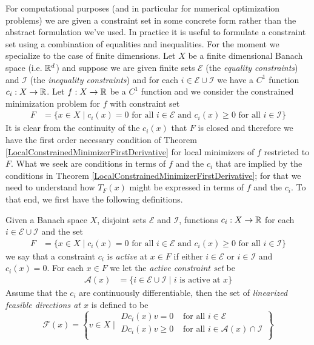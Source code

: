  For computational purposes (and in particular for numerical
optimization problems) we are given a constraint set in some concrete
form rather than the abstract formulation we've used.  In practice it
is useful to formulate a constraint set using a combination of
equalities and inequalities.  For the moment we specialize to the case
of finite dimensions.  Let $X$ be a finite dimensional Banach space
(i.e. $\mathbb{R}^d$) and suppose we are given finite sets $\mathcal{E}$
(the \emph{equality constraints})
and $\mathcal{I}$ (the \emph{inequality constraints}) and for each $i
\in \mathcal{E} \cup \mathcal{I}$ we have a $C^1$ 
function $c_i : X \to \mathbb{R}$.  Let $f : X \to \mathbb{R}$ be a $C^1$
function and we consider the constrained minimization problem for $f$
with constraint set 
\begin{align*}
F &= \lbrace x \in X \mid c_i(x) = 0 \text{ for all $i \in
    \mathcal{E}$ and } c_i(x) \geq 0 \text{ for all $i \in
    \mathcal{I}$} \rbrace
\end{align*}
It is clear from the continuity of the $c_i(x)$ that $F$ is closed and
therefore we have the first order necessary condition of Theorem
\ref{LocalConstrainedMinimizerFirstDerivative} for local minimizers of
$f$ restricted to $F$.  What we seek are
conditions in terms of $f$ and the $c_i$ that are implied by the
conditions in Theorem \ref{LocalConstrainedMinimizerFirstDerivative};
for that we need to understand how $T_F(x)$ might be expressed in
terms of $f$ and the $c_i$.  To that end, we first have the following
definitions.
\begin{defn}Given a Banach space $X$, disjoint sets $\mathcal{E}$ and
  $\mathcal{I}$, functions $c_i : X \to \mathbb{R}$ for each $i \in
  \mathcal{E} \cup \mathcal{I}$ and the set
\begin{align*}
F &= \lbrace x \in X \mid c_i(x) = 0 \text{ for all $i \in
    \mathcal{E}$ and } c_i(x) \geq 0 \text{ for all $i \in
    \mathcal{I}$} \rbrace
\end{align*}
we say that a constraint $c_i$ is \emph{active} at $x \in F$ if either
$i \in \mathcal{E}$ or $i \in \mathcal{I}$ and $c_i(x) = 0$.  For each
$x \in F$ we let the \emph{active constraint set} be 
\begin{align*}
\mathcal{A}(x) &= \lbrace i \in \mathcal{E} \cup \mathcal{I} \mid i
                 \text{ is active at $x$} \rbrace
\end{align*}
Assume that the $c_i$ are continuously differentiable, then the set of \emph{linearized feasible directions at $x$} is defined to
be 
\begin{equation*}
\mathcal{F}(x) =
\left \{ v \in X \mid
\begin{aligned}
Dc_i(x) v = 0 & \text{ for all $i \in \mathcal{E}$} \\
Dc_i(x) v \geq 0 & \text{ for all $i \in \mathcal{A}(x) \cap \mathcal{I}$} \\
\end{aligned}
\right \}
\end{equation*}
\end{defn}

